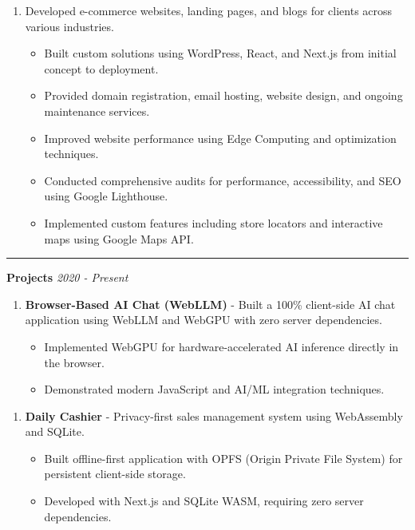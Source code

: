 \documentclass{article}
\begin{document}
\begin{enumerate}
    \item[] Developed e-commerce websites, landing pages, and blogs for clients across various industries.
   \begin{itemize}
    \item Built custom solutions using WordPress, React, and Next.js from initial concept to deployment.
    \item Provided domain registration, email hosting, website design, and ongoing maintenance services.
    \item Improved website performance using Edge Computing and optimization techniques.
    \item Conducted comprehensive audits for performance, accessibility, and SEO using Google Lighthouse.
    \item Implemented custom features including store locators and interactive maps using Google Maps API.
   \end{itemize}
\end{enumerate}



\vspace{1.4em}
\hrule 
\vspace{0.4em}
\hspace{-2.em}
{\bf Projects } \hfill {\em 2020 - Present } %


\begin{enumerate}
    \item \textbf{Browser-Based AI Chat (WebLLM)} - Built a 100\% client-side AI chat application using WebLLM and WebGPU with zero server dependencies.
   \begin{itemize}
    \item Implemented WebGPU for hardware-accelerated AI inference directly in the browser.
    \item Demonstrated modern JavaScript and AI/ML integration techniques.
   \end{itemize}
\end{enumerate}

\begin{enumerate}
    \item \textbf{Daily Cashier} - Privacy-first sales management system using WebAssembly and SQLite.
   \begin{itemize}
    \item Built offline-first application with OPFS (Origin Private File System) for persistent client-side storage.
    \item Developed with Next.js and SQLite WASM, requiring zero server dependencies.
   \end{itemize}
\end{enumerate}
\end{document}
